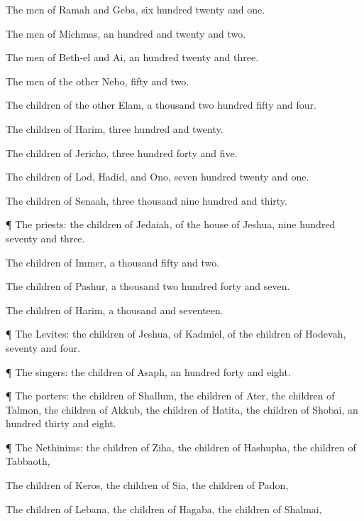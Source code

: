 {The
men of
Ramah and
Geba,
six
hundred
twenty and
one.

The
men of
Michmas, an
hundred and
twenty and
two.

The
men of
Beth-el and
Ai, an
hundred
twenty and
three.

The
men of the
other
Nebo,
fifty and
two.

The
children of the
other
Elam, a
thousand two
hundred
fifty and
four.

The
children of
Harim,
three
hundred and
twenty.

The
children of
Jericho,
three
hundred
forty and
five.

The
children of
Lod,
Hadid, and
Ono,
seven
hundred
twenty and
one.

The
children of
Senaah,
three
thousand
nine
hundred and
thirty.


\par }{\PP {}¶ The
priests: the
children of
Jedaiah, of the
house of
Jeshua,
nine
hundred
seventy and
three.

The
children of
Immer, a
thousand
fifty and
two.

The
children of
Pashur, a
thousand two
hundred
forty and
seven.

The
children of
Harim, a
thousand and
seventeen.


\par }{\PP {}¶ The
Levites: the
children of
Jeshua, of
Kadmiel,
{} of the
children of
Hodevah,
seventy and
four.


\par }{\PP {}¶ The
singers: the
children of
Asaph, an
hundred
forty and
eight.


\par }{\PP {}¶ The
porters: the
children of
Shallum, the
children of
Ater, the
children of
Talmon, the
children of
Akkub, the
children of
Hatita, the
children of
Shobai, an
hundred
thirty and
eight.


\par }{\PP {}¶ The
Nethinims: the
children of
Ziha, the
children of
Hashupha, the
children of
Tabbaoth,

The
children of
Keros, the
children of
Sia, the
children of
Padon,

The
children of
Lebana, the
children of
Hagaba, the
children of
Shalmai,

}
